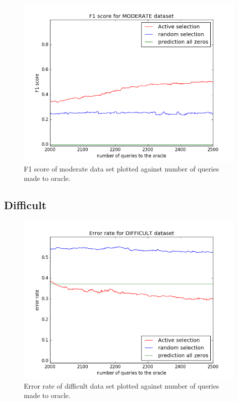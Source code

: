 \documentclass[paper=a4, fontsize=11pt]{scrartcl}
\numberwithin{equation}{section}    %
\numberwithin{figure}{section}      %
\numberwithin{table}{section}       %
\numberwithin{equation}{section}    %
\numberwithin{figure}{section}      %
\numberwithin{table}{section}       %
\begin{document}
\begin{figure}[!htb]
  \centering
  \includegraphics[scale = 0.5]{figures/f1_moderate.png}
      \caption{F1 score of moderate data set plotted against number of queries made to oracle.}
      \label{modf}
\end{figure}
\FloatBarrier
\subsection{Difficult}


\begin{figure}[!htb]
  \centering
  \includegraphics[scale = 0.5]{figures/error_difficult.png}
      \caption{Error rate of difficult data set plotted against number of queries made to oracle.}
      \label{harderror}
\end{figure}
\end{document}
